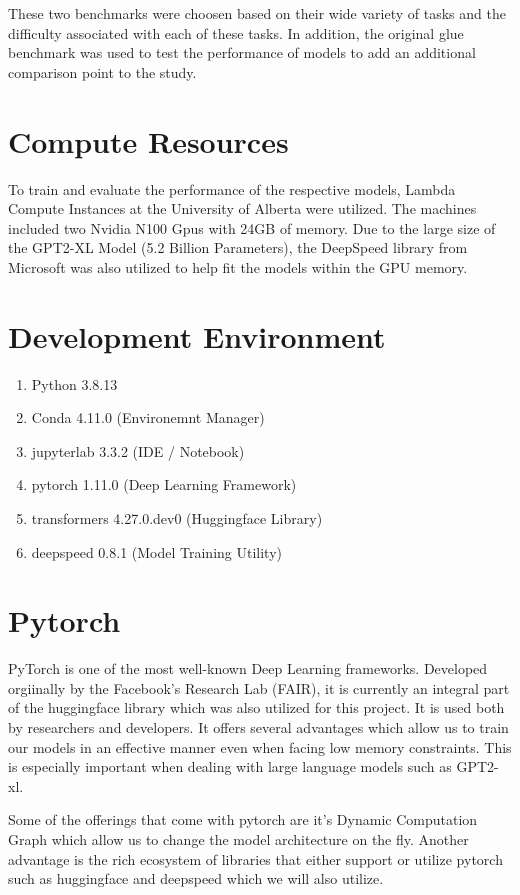 \documentclass[\main/thesis.tex]{subfiles}
\begin{document}
These two benchmarks were choosen based on their wide variety of tasks and the difficulty 
associated with each of these tasks. In addition, the original glue benchmark was used to test the performance of 
models to add an additional comparison point to the study. 


\section{Compute Resources}\label{sec:computeResources}
To train and evaluate the performance of the respective models, Lambda Compute Instances at the University of Alberta 
were utilized. The machines included two Nvidia N100 Gpus with 24GB of memory. Due to the large size of the GPT2-XL 
Model (5.2 Billion Parameters), the DeepSpeed\cite{rajbhandari_zero_2020} library from Microsoft was also utilized to 
help fit the models within the GPU memory. 

\section{Development Environment}
\begin{enumerate}
    \item Python 3.8.13
    \item Conda 4.11.0 (Environemnt Manager)
    \item jupyterlab 3.3.2 (IDE / Notebook)
    \item pytorch 1.11.0 (Deep Learning Framework)
    \item transformers 4.27.0.dev0 (Huggingface Library)
    \item deepspeed 0.8.1 (Model Training Utility)
\end{enumerate}

\section{Pytorch}\label{sec:pytorch}
PyTorch\cite{paszke_pytorch_2019} is one of the most well-known Deep Learning frameworks. Developed orgiinally by the Facebook's Research Lab (FAIR), 
it is currently an integral part of the huggingface library which was also utilized for this project. It is used both by
researchers and developers. It offers several advantages which allow us to train our models in an effective manner even when 
facing low memory constraints. This is especially important when dealing with large language models such as GPT2-xl. 

Some of the offerings that come with pytorch are it's Dynamic Computation Graph which allow us to change the model architecture 
on the fly. Another advantage is the rich ecosystem of libraries that either support or utilize pytorch such as 
huggingface and deepspeed which we will also utilize. 
\end{document}

